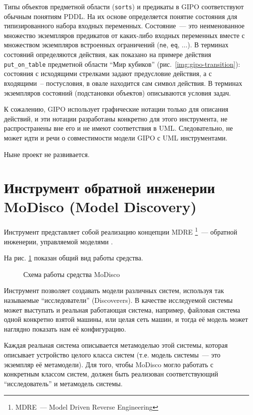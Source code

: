 Типы объектов предметной области (\texttt{sorts}) и предикаты в GIPO соответствуют обычным понятиям PDDL. На их основе определяется понятие состояния для типизированного набора входных переменных. 
Состояние~--- это неименованное множество экземпляров предикатов от каких-либо входных переменных вместе с множеством экземпляров встроенных ограничений (\texttt{ne}, \texttt{eq}, ...). 
В терминах состояний определяются действия, как показано на примере действия \texttt{put\_on\_table} предметной области ``Мир кубиков'' (рис.~\ref{img:gipo-transition}): состояния с исходящими стрелками задают предусловие действия, а с входящими~-- постусловия, в овале находится сам символ действия. 
В терминах экземпляров состояний (подстановки объектов) описываются условия задач.

К сожалению, GIPO использует графические нотации только для описания действий, и эти нотации разработаны конкретно для этого инструмента, не распространены вне его и не имеют соответствия в UML.
Следовательно, не может идти и речи о совместимости модели GIPO с UML инструментами.

Ныне проект не развивается.


\section{Инструмент обратной инженерии MoDisco (Model Discovery)}

Инструмент представляет собой реализацию концепции MDRE \footnote{MDRE~--- Model Driven Reverse Engineering}~--- обратной инженерии, управляемой моделями \cite{modisco}. 

На  рис. \ref{img:modisco_overview} показан общий вид работы средства.
    
    \begin{figure}[h]
        \caption{Схема работы средства MoDisco}
        \label{img:modisco_overview}

    \end{figure}   

Инструмент позволяет создавать модели различных систем, используя так называемые ``исследователи'' (Discoverers).
В качестве исследуемой системы может выступать и реальная работающая система, например, файловая система одной конкретно взятой машины, или целая сеть машин, и тогда её модель может наглядно показать нам её конфигурацию.

Каждая реальная система описывается метамоделью этой системы, которая описывает устройство целого класса систем (т.е. модель системы~--- это экземпляр её метамодели).
Для того, чтобы MoDisco могло работать с конкретным классом систем, должен быть реализован соответствующий ``исследователь'' и метамодель системы.

